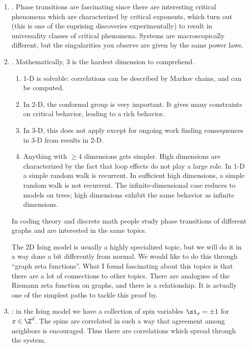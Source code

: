\begin{enumerate}
\item 
{}. Phase transitions are fascinating since there are interesting critical phenomena which are characterized by critical exponents, which turn out (this is one of the suprising discoveries experimentally) to result in universality classes of critical phenomena. Systems are macroscopically different, but the singularities you observe are given by the same power laws.
\item
{}. %
Mathematically, 3 is the hardest dimension to comprehend.
\begin{enumerate}
\item
1-D is solvable: correlations can be described by Markov chains, and can be computed. 
\item
In 2-D, the conformal group is very important. It gives many constraints on critical behavior, leading to a rich behavior. 
\item
In 3-D, this does not apply except for ongoing work finding consequences in 3-D from results in 2-D. 
\item
Anything with $\ge 4$ dimensions gets simpler. High dimensions are characterized by the fact that loop effects do not play a large role. In 1-D a simple random walk is recurrent. In sufficient high dimensions, a simple random walk is not recurrent.
The infinite-dimensional case reduces to models on trees; high dimensions exhibit the same behavior as infinite dimensions.
\end{enumerate}
In coding theory and discrete math people study phase transitions of different graphs and are interested in the same topics.

The 2D Ising model is usually a highly specialized topic, but we will do it in a way done a bit differently from normal. We would like to do this through ``graph zeta functions''. What I found fascinating about this topics is that there are a lot of connections to other topics. There are analogues of the Riemann zeta function on graphs, and there is a relationship. It is actually one of the simplest paths to tackle this proof by. 

\item
{}: in the Ising model we have a collection of spin variables $\si_x=\pm1$ for $x\in \Z^d$. The spins are correlated in such a way that agreement among neighbors is encouraged. Thus there are correlations which spread through the system. 


\end{enumerate}
